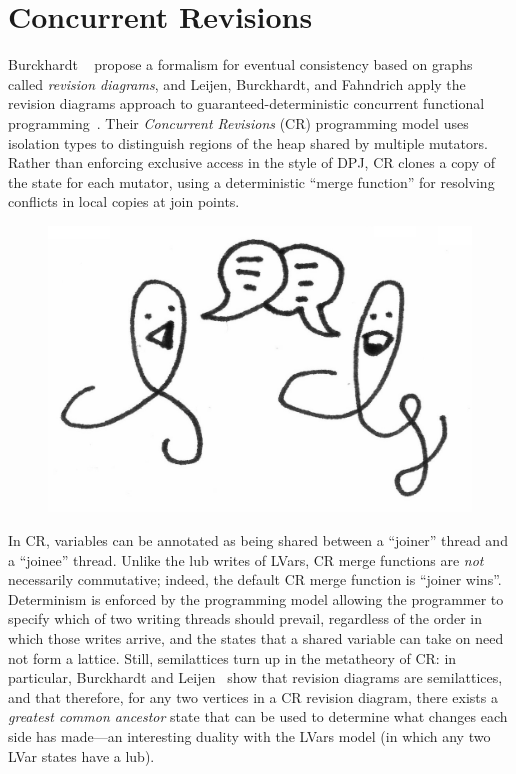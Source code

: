 \section{Concurrent Revisions}

Burckhardt \etal~
propose a formalism for eventual consistency based on graphs called
\emph{revision diagrams}, and Leijen, Burckhardt, and Fahndrich apply
the revision diagrams approach to guaranteed-deterministic concurrent
functional programming~.
Their \emph{Concurrent Revisions} (CR) programming model uses
isolation types to distinguish regions of the heap shared by multiple
mutators.  Rather than enforcing exclusive access in the style of DPJ,
CR clones a copy of the state for each mutator, using a deterministic
``merge function'' for resolving conflicts in local copies at join
points.

\ifdefined\DISSERTATION
\begin{figure}
\vspace{-1em}
\begin{center}
  \includegraphics[scale=0.15]{../illustrations/communicating-threads}
\end{center}
\vspace{-2em}
\end{figure}
\fi

In CR, variables can be annotated as being shared between a ``joiner''
thread and a ``joinee'' thread.  Unlike the lub writes of LVars, CR
merge functions are \emph{not} necessarily commutative; indeed, the
default CR merge function is ``joiner wins''.  Determinism is enforced
by the programming model allowing the programmer to specify which of
two writing threads should prevail, regardless of the order in which
those writes arrive, and the states that a shared variable can take on
need not form a lattice.  Still, semilattices turn up in the
metatheory of CR: in particular, Burckhardt and
Leijen~ show that revision
diagrams are semilattices, and that therefore, for any two vertices in
a CR revision diagram, there exists a \emph{greatest common ancestor}
state that can be used to determine what changes each side has
made---an interesting duality with the LVars model (in which any two
LVar states have a lub).

